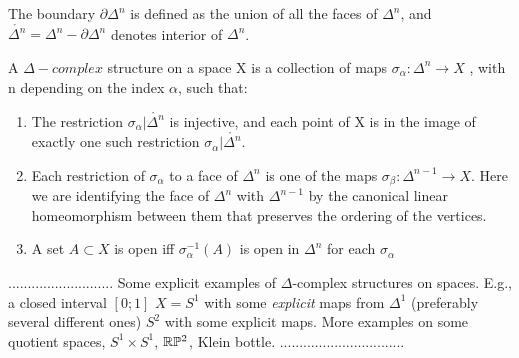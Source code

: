 \documentclass[11pt,a4paper]{report}
\begin{document}
             The boundary $\partial\Delta^n$ is defined as the union of all the faces of $\Delta^n$, and
             $\mathring{\Delta^n} = \Delta^n - \partial\Delta^n $ denotes interior of $\Delta^n$. 
             
		      \begin{defn}
		      	A $\Delta-complex$ structure on a space X is a collection of maps $\sigma_\alpha: \Delta^n \rightarrow X $ , with n depending on the index $\alpha$, such that:
                    \begin{enumerate}
                        \item The restriction $\sigma_\alpha | \mathring{\Delta^n}$ is                      injective, and each point of X is in the image of exactly one such restriction $\sigma_\alpha | \mathring{\Delta^n}$.
                        \item Each restriction of $\sigma_\alpha$ to a face of $\Delta^n$ is one of the  maps
                        $\sigma_\beta: \Delta^{n-1} \rightarrow X $. Here we are identifying the face of $\Delta^n$ with $\Delta^{n-1}$ by the canonical linear homeomorphism between them that preserves the ordering of the vertices.
                        \item A set $A \subset X$ is open iff $\sigma^{-1}_{\alpha}(A)$ is open in $\Delta^n$ for each $\sigma_\alpha$
                    \end{enumerate}

		      \end{defn}
		      
		      ...........................
		      Some explicit examples of $\Delta$-complex structures on spaces. E.g., 
		      a closed interval $[0;1]$
		      $X=S^1$ with some \emph{explicit} maps from $\Delta^1$ (preferably several different ones) 
		      $S^2$ with some explicit maps. More examples on some quotient spaces, $S^1\times S^1$, $\mathbb{R}\mathbb{P}^2$, Klein bottle.
		      ................................
		      
\end{document}
